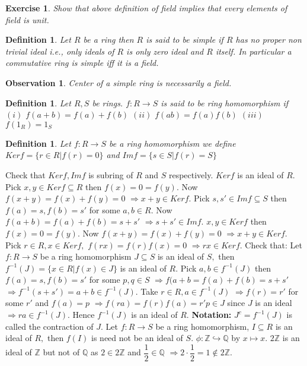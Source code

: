 \documentclass[11pt]{amsart}
\newtheorem{definition}[theorem]{Definition}%
\newtheorem{defn}[theorem]{Definition}
\newtheorem{ex}[theorem]{Exercise}
\newtheorem{obs}[theorem]{Observation}
\newcommand{\QQ}{\mathbb Q}
\newcommand{\ZZ}{\mathbb Z}
\begin{document}
\begin{ex}
Show that above definition of field implies that every elements of field is unit.
\end{ex}

\begin{defn}
Let $R$ be a ring then $R$ is said to be simple if $R$ has no proper non trivial ideal i.e., only ideals of $R$ is only zero ideal and $R$ itself. In particular a commutative ring is simple iff it is a field.
\end{defn}
\begin{obs}
Center of a simple ring is necessarily a field.
\end{obs}
\begin{definition}
Let $R,S$ be rings. $f:R \rightarrow S$ is said to be ring homomorphism if 
\newline $(i)$ $f(a+b)=f(a)+f(b)$
\newline $(ii)$ $f(ab)=f(a)f(b)$
\newline $(iii)$ $f(1_{R})=1_{S}$
\end{definition}
\begin{definition}
Let $f: R \rightarrow S$ be a ring homomorphism we define $Kerf=\{r \in R|f(r)=0 \}$ and $Imf=\{s \in S|f(r)=S \}$
\end{definition}
Check that $Kerf, Imf$ is subring of $R$ and $S$ respectively. $Kerf$ is an ideal of $R.$ Pick $x,y \in Kerf \subseteq R$ then $f(x)=0=f(y).$ Now $f(x+y)=f(x)+f(y)=0$ $\Rightarrow x+y \in Kerf.$ Pick $s,s' \in Imf \subseteq S$ then $f(a)=s,f(b)=s'$ for some $a,b \in R.$ Now $f(a+b)=f(a)+f(b)=s+s'$ $\Rightarrow s+s' \in Imf.$ $x,y \in Kerf$ then $f(x)=0=f(y).$ Now $f(x+y)=f(x)+f(y)=0$ $\Rightarrow x+y \in Kerf.$ Pick $r \in R, x \in Kerf,$ $f(rx)=f(r)f(x)=0$ $\Rightarrow rx\in Kerf.$ 
\newline Check that: Let $f: R \rightarrow S$ be a ring homomorphism $J\subseteq S $ is an ideal of $S,$ then $f^{-1}(J)=\{x\in R| f(x)\in J \}$ is an ideal of $R.$ Pick $a,b \in f^{-1}(J)$ then $f(a)=s, f(b)=s'$ for some $p,q \in S$ $\Rightarrow f(a+b=f(a)+f(b)=s+s'$ $\Rightarrow f^{-1}(s+s')=a+b \in f^{-1}(J).$ Take $r \in R, a \in f^{-1}(J)$ $\Rightarrow f(r)=r'$ for some $r'$ and $f(a)=p$ $\Rightarrow f(ra)=f(r)f(a)=r'p \in J$ since $J$ is an ideal $\Rightarrow ra \in f^{-1}(J).$ Hence $f^{-1}(J)$ is an ideal of $R.$
\newline \textbf{Notation:}  $J^{c}=f^{-1}(J)$ is called the contraction of $J.$
\newline Let $f: R \rightarrow S$ be a ring homomorphism, $I\subseteq R$ is an ideal of $R,$ then $f(I)$ is need not be an ideal of $S.$ $\phi: {\ZZ} \hookrightarrow {\QQ}$ by $x \mapsto x.$ $2{\ZZ}$ is an ideal of ${\ZZ}$ but not of ${\QQ}$ as $2 \in 2{\ZZ}$ and $\dfrac{1}{2}\in {\QQ}$ $\Rightarrow 2\cdot \dfrac{1}{2}=1 \notin 2{\ZZ}.$
\end{document}
